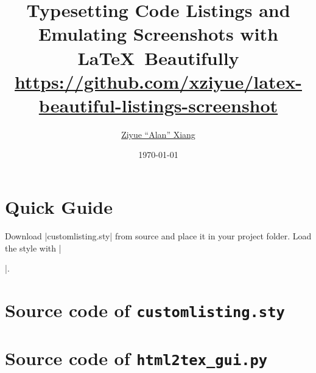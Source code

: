 \documentclass[letterpaper, 11pt, DIV=11]{scrartcl}
\author{\href{https://www.alanshawn.com}{Ziyue ``Alan'' Xiang}}
\title{Typesetting Code Listings and Emulating Screenshots with \LaTeX\  Beautifully\\ {\small \url{https://github.com/xziyue/latex-beautiful-listings-screenshot}}}
\date{\today}
\begin{document}

\maketitle

\tableofcontents

\clearpage



\section{Quick Guide}

Download \rawinline|customlisting.sty| from source and place it in your project folder. Load the style with \texinline|\usepackage{customlisting}|.

\appendix

\section{Source code of \texttt{customlisting.sty}}


\section{Source code of \texttt{html2tex\_gui.py}}

\end{document}
